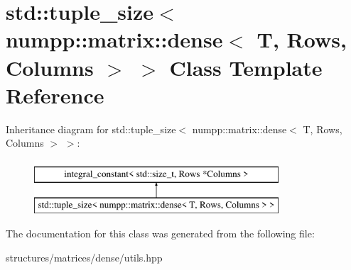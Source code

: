 \hypertarget{classstd_1_1tuple__size_3_01numpp_1_1matrix_1_1dense_3_01T_00_01Rows_00_01Columns_01_4_01_4}{}\section{std\+:\+:tuple\+\_\+size$<$ numpp\+:\+:matrix\+:\+:dense$<$ T, Rows, Columns $>$ $>$ Class Template Reference}
\label{classstd_1_1tuple__size_3_01numpp_1_1matrix_1_1dense_3_01T_00_01Rows_00_01Columns_01_4_01_4}
Inheritance diagram for std\+:\+:tuple\+\_\+size$<$ numpp\+:\+:matrix\+:\+:dense$<$ T, Rows, Columns $>$ $>$\+:\begin{figure}[H]
\begin{center}
\leavevmode
\includegraphics[height=2.000000cm]{classstd_1_1tuple__size_3_01numpp_1_1matrix_1_1dense_3_01T_00_01Rows_00_01Columns_01_4_01_4}
\end{center}
\end{figure}


The documentation for this class was generated from the following file\+:\begin{DoxyCompactItemize}
\item 
structures/matrices/dense/utils.\+hpp\end{DoxyCompactItemize}
